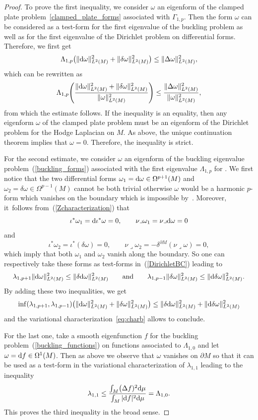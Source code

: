\documentclass[pdftex]{sigma}
\numberwithin{equation}{section}
\theoremstyle{definition}
\begin{document}
\begin{proof} To prove the first inequality, we consider $\omega$ an eigenform of the clamped plate problem~\eqref{clamped_plate_forms} associated with $\Gamma_{1,p}$. Then the form $\omega$ can be considered as a test-form for the first eigenvalue of the buckling problem as well as for the first eigenvalue of the Dirichlet problem on differential forms. Therefore, we first get
\[
\Lambda_{1,p}\bigl(\|{\rm d}\omega\|^2_{L^2(M)} +\|\delta \omega\|^2_{L^2(M)}\bigr) \le \|\Delta \omega\|^2_{L^2(M)},
\]
which can be rewritten as
\[
\Lambda_{1,p} \Biggl(\frac{\|{\rm d}\omega\|^2_{L^2(M)} +\|\delta \omega\|^2_{L^2(M)}}{\| \omega\|^2_{L^2(M)}}\Biggr)\le \frac{\|\Delta \omega\|^2_{L^2(M)}}{\| \omega\|^2_{L^2(M)}},
\]
from which the estimate follows. If the inequality is an equality, then any eigenform $\omega$ of the clamped plate problem must be an eigenform of the Dirichlet problem for the Hodge Laplacian on $M$.
As above, the unique continuation theorem implies that $\omega=0$.
Therefore, the inequality is strict.


For the second estimate, we consider $\omega$ an eigenform of the buckling eigenvalue problem~(\ref{buckling_forms}) associated with the first eigenvalue $\Lambda_{1,p}$ for . We first notice that the two differential forms $\omega_1={\rm d}\omega\in\Omega^{p+1}(M)$ and $\omega_2=\delta\omega\in\Omega^{p-1}(M)$ cannot be both trivial otherwise $\omega$ would be a harmonic $p$-form which vanishes on the boundary which is impossible by~\cite{Anne89}. Moreover, it~follows from~(\ref{Zcharacterization}) that
\[
\iota^*\omega_1={\rm d}\iota^*\omega=0,\qquad \nu\lrcorner\omega_1=\nu\lrcorner {\rm d}\omega=0
\]
and
\[
\iota^*\omega_2=\iota^*(\delta\omega)=0,\qquad\nu\lrcorner\omega_2=-\delta^{\partial M}(\nu\lrcorner\omega)=0,
\]
which imply that both $\omega_1$ and $\omega_2$ vanish along the boundary. So one can respectively take these forms as test-forms in~(\ref{DirichletBC}) leading to
\[
\lambda_{1,p+1}\| {\rm d} \omega\|^2_{L^2(M)} \le \|\delta {\rm d} \omega\|^2_{L^2(M)} \qquad \text{and} \qquad \lambda_{1,p-1}\| \delta \omega\|^2_{L^2(M)} \le \|{\rm d}\delta \omega\|^2_{L^2(M)}.
\]
By adding these two inequalities, we get
\[
\inf(\lambda_{1,p+1}, \lambda_{1,p-1}) \bigl(\| {\rm d} \omega\|^2_{L^2(M)} + \| \delta \omega\|^2_{L^2(M)} \bigr) \le \|\delta {\rm d} \omega\|^2_{L^2(M)}+\|{\rm d}\delta \omega\|^2_{L^2(M)}
\]
and the variational characterization~\eqref{eq:charb} allows to conclude.

For the last one, take a smooth eigenfunction $f$ for the buckling problem~(\ref{buckling_functions}) on functions associated to $\Lambda_{1,0}$ and let $\omega={\rm d}f\in\Omega^1(M)$. Then as above we observe that $\omega$ vanishes on $\partial M$ so that it can be used as a test-form in the variational characterization of $\lambda_{1,1}$ leading to the inequality
\[
\lambda_{1,1}\leq \frac{\int_M\bigl(\Delta f)^2{\rm d}\mu}{\int_M |{\rm d}f|^2{\rm d}\mu}=\Lambda_{1,0}.
\]
This proves the third inequality in the broad sense.
\end{proof}
\end{document}
